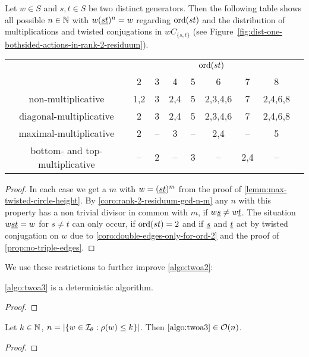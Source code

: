 \begin{coro}
	Let $w \in S$ and $s,t \in S$ be two distinct generators. Then the following table shows all possible $n \in \mathbb{N}$ with $w(\underline{s} \underline{t})^n = w$ regarding $\operatorname{ord}(st)$ and the distribution of multiplications and twisted conjugations in $wC_{\{s,t\}}$ (see Figure~\ref{fig:dist-one-bothsided-actions-in-rank-2-residuum}).

	\begin{center}
		\begin{tabular}{c|ccccccc|c}
													& \multicolumn{7}{c|}{$\operatorname{ord}(st)$} \\
													& 2 & 3 & 4 & 5 & 6 & 7 & 8 \\
			\hline
			\textrm{non-multiplicative}				& 1,2 & 3 & 2,4 & 5 & 2,3,4,6 & 7 & 2,4,6,8 \\
			\textrm{diagonal-multiplicative}		& 2 & 3 & 2,4 & 5 & 2,3,4,6 & 7 & 2,4,6,8 \\
			\textrm{maximal-multiplicative}			& 2 & -- & 3 & -- & 2,4 & -- & 5 \\
			\textrm{bottom- and top-multiplicative}	& -- & 2 & -- & 3 & -- & 2,4 & -- \\
		\end{tabular}		
	\end{center}

	\begin{proof}
		In each case we get a $m$ with $w = (\underline{s} \underline{t})^m$ from the proof of \ref{lemm:max-twisted-circle-height}. By \ref{coro:rank-2-residuum-gcd-n-m} any $n$ with this property has a non trivial divisor in common with $m$, if $w \underline{s} \neq w \underline{t}$. The situation $w \underline{s} \underline{t} = w$ for $s \neq t$ can only occur, if $\operatorname{ord}(st) = 2$ and if $\underline{s}$ and $\underline{t}$ act by twisted conjugation on $w$ due to \ref{coro:double-edges-only-for-ord-2} and the proof of \ref{prop:no-triple-edges}.
	\end{proof}
\end{coro}

We use these restrictions to further improve \ref{algo:twoa2}:

\begin{algo}[TWOA3]
	\todo
\end{algo}

\begin{lemm}
	\ref{algo:twoa3} is a deterministic algorithm.

	\begin{proof}
		\todo
	\end{proof}
\end{lemm}

\begin{lemm}
	Let $k \in \mathbb{N}$, $n = |\{ w \in \mathcal{I}_{\theta} : \rho(w) \leq k \}|$. Then $\ref{algo:twoa3} \in \mathcal{O}(n)$.

	\begin{proof}
		\todo
	\end{proof}
\end{lemm}